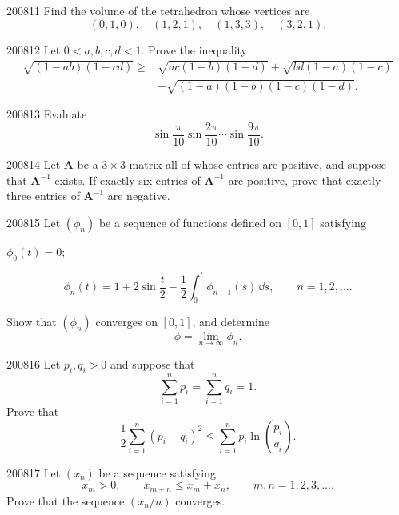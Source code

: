 \begin{problem}{2008}{1}{1}
Find the volume of the tetrahedron whose vertices are
\[
    (0, 1, 0), \quad(1, 2, 1), \quad(1, 3, 3), \quad(3, 2, 1).
\]
\end{problem}

\begin{problem}{2008}{1}{2}
Let $0<a, b, c, d<1$. Prove the inequality
\[
\begin{aligned}
    \sqrt{(1-ab)(1-cd)}
    \ge{}&\sqrt{ac(1-b)(1-d)}
    +\sqrt{bd(1-a)(1-c)}\\
    &+\sqrt{(1-a)(1-b)(1-c)(1-d)}.
\end{aligned}
\]
\end{problem}

\begin{problem}{2008}{1}{3}
Evaluate
\[
    \sin\frac{\pi}{10}
    \sin\frac{2\pi}{10}
    \cdots
    \sin\frac{9\pi}{10}.
\]
\end{problem}

\begin{problem}{2008}{1}{4}
Let $\mathbf A$ be a $3\times3$ matrix all of whose entries are positive, and suppose that $\mathbf A^{-1}$ exists. If exactly six entries of $\mathbf A^{-1}$ are positive, prove that exactly three entries of $\mathbf A^{-1}$ are negative.
\end{problem}

\begin{problem}{2008}{1}{5}
Let $(\phi_n)$ be a sequence of functions defined on $[0, 1]$ satisfying
\begin{problemsubparts}
    \item $\phi_0(t)=0$;
    \item
    \[
        \phi_n(t)
        =1+2\sin\frac t2
        -\frac12\int_0^t\phi_{n-1}(s)\, \dd s,
        \qquad n=1, 2, \dots.
    \]
\end{problemsubparts}
Show that $(\phi_n)$ converges on $[0, 1]$, and determine
\[
    \phi=\lim_{n\to\infty}\phi_n.
\]
\end{problem}

\begin{problem}{2008}{1}{6}
Let $p_i, q_i>0$ and suppose that
\[
    \sum_{i=1}^{n}p_i=\sum_{i=1}^{n}q_i=1.
\]
Prove that
\[
    \frac12\sum_{i=1}^{n}(p_i-q_i)^2
    \le
    \sum_{i=1}^{n}p_i\ln\left(\frac{p_i}{q_i}\right).
\]
\end{problem}

\begin{problem}{2008}{1}{7}
Let $(x_n)$ be a sequence satisfying
\[
    x_m>0,
    \qquad
    x_{m+n}\le x_m+x_n,
    \qquad
    m, n=1, 2, 3, \dots.
\]
Prove that the sequence $(x_n/n)$ converges.
\end{problem}
